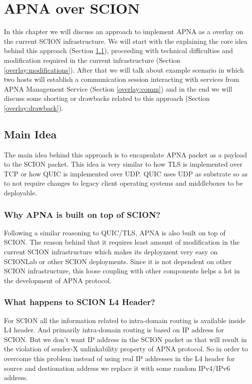 
\chapter{APNA over SCION} %

\label{apna_overlay}
In this chapter we will discuss an approach to implement APNA as a overlay on the current SCION infrastructure. We will start with the explaining the core idea behind this approach (Section \ref{overlay:main_idea}), proceeding with technical difficulties and modification required in the current infrastructure (Section \ref{overlay:modifications}). After that we will talk about example scenario in which two hosts will establish a communication session interacting with services from APNA Management Service (Section \ref{overlay:comm}) and in the end we will discuss some shorting or drawbacks related to this approach (Section \ref{overlay:drawback}).

\section{Main Idea} \label{overlay:main_idea}

The main idea behind this approach is to encapsulate APNA packet as a payload to the SCION packet. This idea is very similar to how TLS is implemented over TCP or how QUIC is implemented over UDP.  QUIC uses UDP as substrate so as to not require changes to legacy client operating systems and middleboxes to be deployable.

\subsection{Why APNA is built on top of SCION?}
Following a similar reasoning to QUIC/TLS, APNA is also built on top of SCION. The reason behind that it requires least amount of modification in the current SCION infrastructure which makes its deployment very easy on SCIONLab or other SCION deployments. Since it is not dependent on other SCION infrastructure, this loose coupling with other components helps a lot in the development of APNA protocol.

\subsection{What happens to SCION L4 Header?} \label{overlay:miss_l4}
For SCION all the information related to intra-domain routing is available inside L4 header. And primarily intra-domain routing is based on IP address for SCION. But we don't want IP address in the SCION packet as that will result in the violation of sender-X unlinkability property of APNA protocol. So in order to overcome this problem instead of using real IP addresses in the L4 header for source and destionation address we replace it with some random IPv4/IPv6 address.

